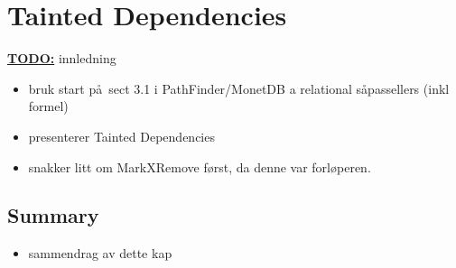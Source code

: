 \chapter{Tainted Dependencies}
\label{sect:translation}


\textbf{\underline{\LARGE TODO:}} innledning
\begin{itemize}
  \item bruk start p\aa~sect 3.1 i  PathFinder/MonetDB a relational s\aa passellers (inkl formel)
  \item presenterer Tainted Dependencies
  \item snakker litt om MarkXRemove f\o rst, da denne var forl\o peren.
\end{itemize}





\section{Summary}
\label{sect:trans:summary}
\begin{itemize}
  \item sammendrag av dette kap
\end{itemize}